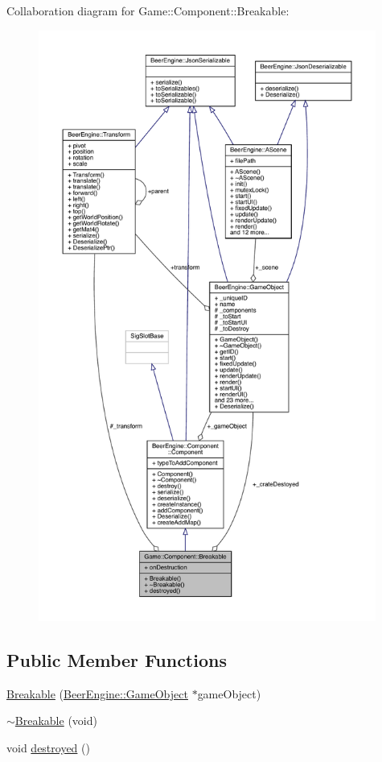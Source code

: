 Collaboration diagram for Game\+:\+:Component\+:\+:Breakable\+:
\nopagebreak
\begin{figure}[H]
\begin{center}
\leavevmode
\includegraphics[height=550pt]{class_game_1_1_component_1_1_breakable__coll__graph}
\end{center}
\end{figure}
\subsection*{Public Member Functions}
\begin{DoxyCompactItemize}
\item 
\mbox{\hyperlink{class_game_1_1_component_1_1_breakable_ad739d120313be059576347fd7c691173}{Breakable}} (\mbox{\hyperlink{class_beer_engine_1_1_game_object}{Beer\+Engine\+::\+Game\+Object}} $\ast$game\+Object)
\item 
\mbox{\hyperlink{class_game_1_1_component_1_1_breakable_a865e322dd9c71227b699f85bd492b481}{$\sim$\+Breakable}} (void)
\item 
void \mbox{\hyperlink{class_game_1_1_component_1_1_breakable_a2b58c2c6c0132f8defc9b1e80220530b}{destroyed}} ()
\end{DoxyCompactItemize}
